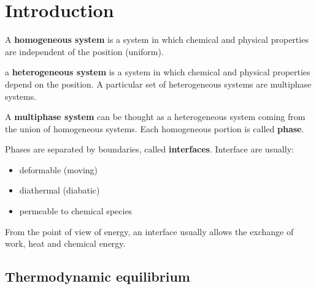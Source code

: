 
\chapter{Introduction}
A \textbf{homogeneous system} is a system in which chemical and physical
properties are independent of the position (uniform).

a \textbf{heterogeneous system} is a system in which chemical and physical
properties depend on the position. A particular set of heterogeneous systems are
multiphase systems.

A \textbf{multiphase system} can be thought as a heterogeneous system coming
from the union of homogeneous systems. Each homogeneous portion is called
\textbf{phase}.


Phases are separated by boundaries, called \textbf{interfaces}. Interface are
usually:
\begin{itemize}
    \item deformable (moving)
    \item diathermal (diabatic)
    \item permeable to chemical species
\end{itemize}

From the point of view of energy, an interface usually allows the exchange of
work, heat and chemical energy.

\section{Thermodynamic equilibrium}
